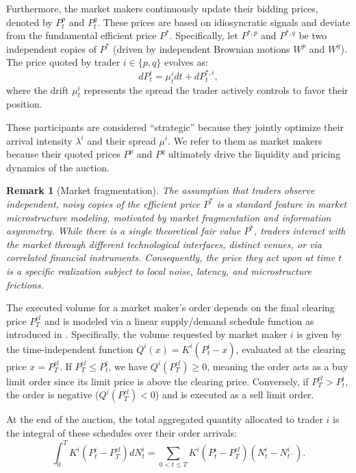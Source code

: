 \documentclass[12pt]{article}
\newtheorem{remark}[theorem2]{Remark}
\begin{document}
Furthermore, the market makers continuously update their bidding prices, denoted by $P^p_t$ and $P^q_t$. These prices are based on idiosyncratic signals and deviate from the fundamental efficient price $P^*$. Specifically, let $P^{*,p}$ and $P^{*,q}$ be two independent copies of $P^*$ (driven by independent Brownian motions $W^p$ and $W^q$). The price quoted by trader $i \in \{p,q\}$ evolves as:
$$dP^i_t = \mu^i_t dt + dP_t^{*,i},$$
where the drift $\mu^i_t$ represents the spread the trader actively controls to favor their position. \vspace{0.5em}

These participants are considered ``strategic'' because they jointly optimize their arrival intensity $\lambda^i$ and their spread $\mu^i$. We refer to them as market makers because their quoted prices $P^p$ and $P^q$ ultimately drive the liquidity and pricing dynamics of the auction.

\begin{remark}[Market fragmentation]
The assumption that traders observe independent, noisy copies of the efficient price $P^*$ is a standard feature in market microstructure modeling, \cite{hasbrouck1995one,ohara2015high} motivated by market fragmentation and information asymmetry. While there is a single theoretical fair value $P^*$, traders interact with the market through different technological interfaces, distinct venues, or via correlated financial instruments. Consequently, the price they act upon at time $t$ is a specific realization subject to local noise, latency, and microstructure frictions.
\end{remark}

The executed volume for a market maker's order depends on the final clearing price $P^{cl}_T$ and is modeled via a linear supply/demand schedule function as introduced in \cite{klemperer1989supply}. Specifically, the volume requested by market maker $i$ is given by the time-independent function $Q^i(x) = K^i(P^i_t - x)$, evaluated at the clearing price $x = P^{cl}_T$. If $P^{cl}_T \leq P^i_t$, we have $Q^i(P^{cl}_T) \geq 0$, meaning the order acts as a buy limit order since its limit price is above the clearing price. Conversely, if $P^{cl}_T > P^i_t$, the order is negative ($Q^i(P^{cl}_T) < 0$) and is executed as a sell limit order. 

At the end of the auction, the total aggregated quantity allocated to trader $i$ is the integral of these schedules over their order arrivals:
$$ \int_0^T K^i(P^i_{t} - P^{cl}_T)dN^i_t = \sum_{0 < t \leq T} K^i(P^i_{t} - P^{cl}_T)(N^i_t - N^i_{t^{-}}). $$
\end{document}
